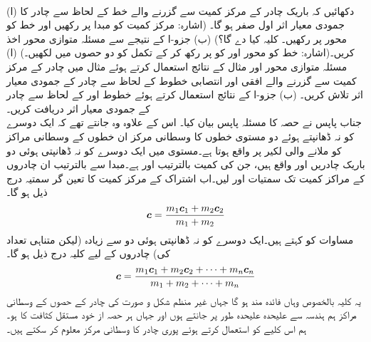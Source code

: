 \\
(ا) دکھائیں کہ باریک چادر کے مرکز کمیت سے گزرنے والے  خط کے لحاظ سے  چادر کا جمودی معیار اثر اول  صفر ہو گا۔ (اشارہ: مرکز کمیت کو مبدا پر رکھیں اور  خط کو محور  پر رکھیں۔ کلیہ  کیا دے گا؟) (ب)  جزو-ا کے نتیجے سے مسئلہ متوازی محور  اخذ کریں۔(اشارہ:  خط  کو محور  اور  کو  پر رکھ کر  کے تکمل کو دو حصوں میں  لکھیں۔)
(ا) مسئلہ متوازی محور  اور مثال  کے نتائج استعمال کرتے ہوئے    مثال      میں چادر کے مرکز کمیت سے گزرنے والے  افقی اور انتصابی خطوط کے لحاظ سے چادر کے جمودی معیار اثر تلاش کریں۔ (ب) جزو-ا کے نتائج استعمال کرتے ہوئے خطوط  اور  کے لحاظ سے چادر کے جمودی معیار اثر دریافت کریں۔
\\
جناب پاپس نے حصہ   کا مسئلہ پاپس بیان کیا۔ اس کے علاوہ وہ جانتے تھے کہ  ایک دوسرے کو نہ ڈھانپتے ہوئے دو  مستوی خطوں  کا وسطانی مرکز  ان خطوں کے وسطانی مراکز کو ملانے والی لکیر پر واقع ہوتا ہے۔مستوی  میں ایک دوسرے کو نہ ڈھانپتی ہوئی   دو باریک چادریں    اور  واقع ہیں،  جن کی کمیت بالترتیب  اور  ہے۔مبدا سے بالترتیب  ان چادروں کے مراکز کمیت تک سمتیات     اور  لیں۔اب اشتراک  کے مرکز کمیت کا تعین گر سمتیہ  درج ذیل   ہو  گا۔
\begin{align}\label{مساوات_بالکثرت_کلیہ_پاپس}
{\ensuremath{{\boldsymbol{c}}}}=\frac{m_1{{\boldsymbol{c}}}_1+m_2{{\boldsymbol{c}}}_2}{m_1+m_2}
\end{align}
مساوات  کو  کہتے ہیں۔ایک دوسرے کو نہ ڈھانپتی ہوئی دو سے زیادہ (لیکن متناہی تعداد کی)  چادروں کے لیے  کلیہ درج ذیل  ہو گا۔
\begin{align}\label{مساوات_بالکثرت_عمومی_کلیہ_پاپس}
{\ensuremath{{\boldsymbol{c}}}}=\frac{m_1{{\boldsymbol{c}}}_1+m_2{{\boldsymbol{c}}}_2+\cdots+m_n{{\boldsymbol{c}}}_n}{m_1+m_2+\cdots+m_n}
\end{align}
یہ کلیہ بالخصوص وہاں فائدہ مند ہو گا جہاں   غیر منظم  شکل و صورت کی چادر کے حصوں کے وسطانی مراکز ہم  ہندسہ سے علیحدہ علیحدہ طور پر جانتے ہوں اور جہاں  ہر حصہ از خود  مستقل کثافت کا ہو۔ ہم اس کلیے کو استعمال کرتے ہوئے پوری چادر کا وسطانی مرکز معلوم کر سکتے ہیں۔ 

